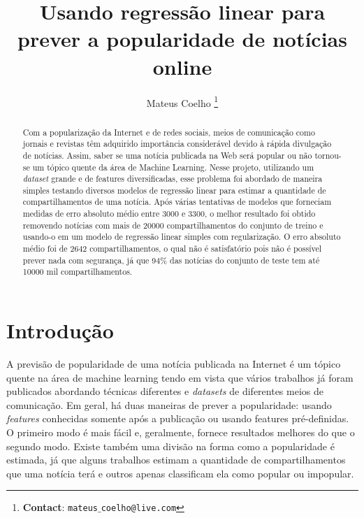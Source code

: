 \documentclass[10pt,twocolumn,letterpaper]{article}
\begin{document}
\title{Usando regressão linear para prever a popularidade de notícias online}
\author{Mateus Coelho \thanks{\textbf{Contact}: \tt\small{mateus$\_$coelho@live.com}}}

\maketitle

\begin{abstract}

Com a popularização da Internet e de redes sociais, meios de comunicação como jornais e revistas têm adquirido importância considerável devido à rápida divulgação de notícias. Assim, saber se uma notícia publicada na Web será popular ou não tornou-se um tópico quente da área de Machine Learning. Nesse projeto, utilizando um \textit{dataset} grande e de features diversificadas, esse problema foi abordado de maneira simples testando diversos modelos de regressão linear para estimar a quantidade de compartilhamentos de uma notícia. Após várias tentativas de modelos que forneciam medidas de erro absoluto médio entre 3000 e 3300, o melhor resultado foi obtido removendo notícias com mais de 20000 compartilhamentos do conjunto de treino e usando-o em um modelo de regressão linear simples com regularização. O erro absoluto médio foi de 2642 compartilhamentos, o qual não é satisfatório pois não é possível prever nada com segurança, já que 94$\%$ das notícias do conjunto de teste tem até 10000 mil compartilhamentos.

\end{abstract}

\section{Introdução}

A previsão de popularidade de uma notícia publicada na Internet é um tópico quente na área de machine learning tendo em vista que vários trabalhos já foram publicados abordando técnicas diferentes e \textit{datasets} de diferentes meios de comunicação. Em geral, há duas maneiras de prever a popularidade: usando \textit{features} conhecidas somente após a publicação ou usando features pré-definidas. O primeiro modo é mais fácil e, geralmente, fornece resultados melhores do que o segundo modo. Existe também uma divisão na forma como a popularidade é estimada, já que alguns trabalhos estimam a quantidade de compartilhamentos que uma notícia terá e outros apenas classificam ela como popular ou impopular.
\end{document}
